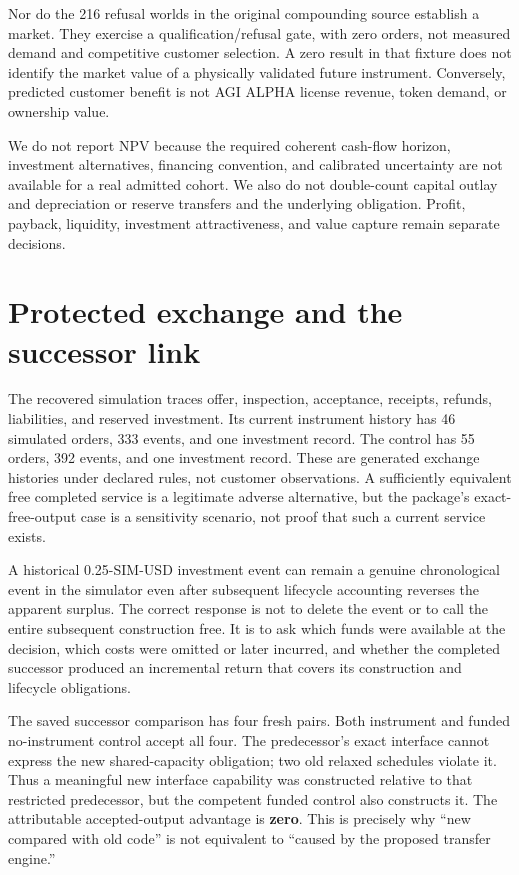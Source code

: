 Nor do the 216 refusal worlds in the original compounding source
establish a market. They exercise a qualification/refusal gate, with
zero orders, not measured demand and competitive customer selection. A
zero result in that fixture does not identify the market value of a
physically validated future instrument. Conversely, predicted customer
benefit is not AGI ALPHA license revenue, token demand, or ownership
value.

We do not report NPV because the required coherent cash-flow horizon,
investment alternatives, financing convention, and calibrated
uncertainty are not available for a real admitted cohort. We also do not
double-count capital outlay and depreciation or reserve transfers and
the underlying obligation. Profit, payback, liquidity, investment
attractiveness, and value capture remain separate decisions.

\section{Protected exchange and the successor link}\label{successor}

The recovered simulation traces offer, inspection, acceptance, receipts,
refunds, liabilities, and reserved investment. Its current instrument
history has 46 simulated orders, 333 events, and one investment record.
The control has 55 orders, 392 events, and one investment record. These
are generated exchange histories under declared rules, not customer
observations. A sufficiently equivalent free completed service is a
legitimate adverse alternative, but the package's exact-free-output case
is a sensitivity scenario, not proof that such a current service exists.

A historical 0.25-SIM-USD investment event can remain a genuine
chronological event in the simulator even after subsequent lifecycle
accounting reverses the apparent surplus. The correct response is not to
delete the event or to call the entire subsequent construction free. It
is to ask which funds were available at the decision, which costs were
omitted or later incurred, and whether the completed successor produced
an incremental return that covers its construction and lifecycle
obligations.

The saved successor comparison has four fresh pairs. Both instrument and
funded no-instrument control accept all four. The predecessor's exact
interface cannot express the new shared-capacity obligation; two old
relaxed schedules violate it. Thus a meaningful new interface capability
was constructed relative to that restricted predecessor, but the
competent funded control also constructs it. The attributable
accepted-output advantage is \textbf{zero}. This is precisely why ``new
compared with old code'' is not equivalent to ``caused by the proposed
transfer engine.''

